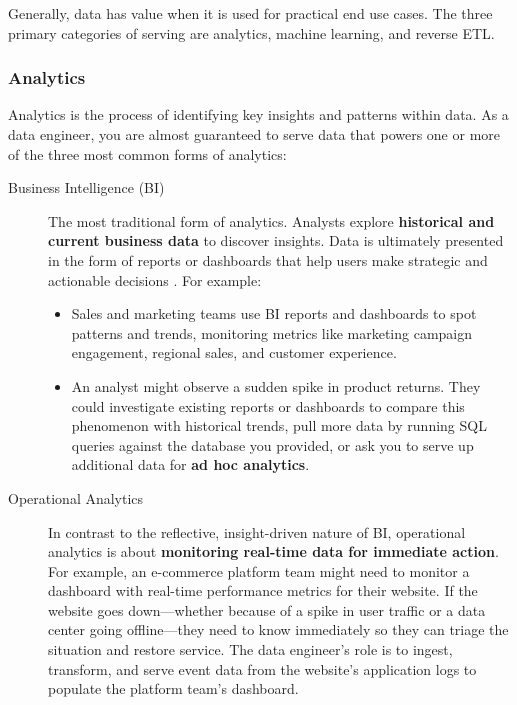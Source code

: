 \documentclass{article}
\begin{document}
Generally, data has value when it is used for practical end use cases. The three primary categories of serving are analytics, machine learning, and reverse ETL.

\subsubsection{Analytics}
Analytics is the process of identifying key insights and patterns within data. As a data engineer, you are almost guaranteed to serve data that powers one or more of the three most common forms of analytics:

\begin{description}
    \item[Business Intelligence (BI)] The most traditional form of analytics. Analysts explore \textbf{historical and current business data} to discover insights. Data is ultimately presented in the form of reports or dashboards that help users make strategic and actionable decisions \cite{kimball2013data}. For example:
    \begin{itemize}
        \item Sales and marketing teams use BI reports and dashboards to spot patterns and trends, monitoring metrics like marketing campaign engagement, regional sales, and customer experience.
        \item An analyst might observe a sudden spike in product returns. They could investigate existing reports or dashboards to compare this phenomenon with historical trends, pull more data by running SQL queries against the database you provided, or ask you to serve up additional data for \textbf{ad hoc analytics}.
    \end{itemize}

    \item[Operational Analytics] In contrast to the reflective, insight-driven nature of BI, operational analytics is about \textbf{monitoring real-time data for immediate action}. For example, an e-commerce platform team might need to monitor a dashboard with real-time performance metrics for their website. If the website goes down---whether because of a spike in user traffic or a data center going offline---they need to know immediately so they can triage the situation and restore service. The data engineer's role is to ingest, transform, and serve event data from the website's application logs to populate the platform team's dashboard.


\end{description}
\end{document}
